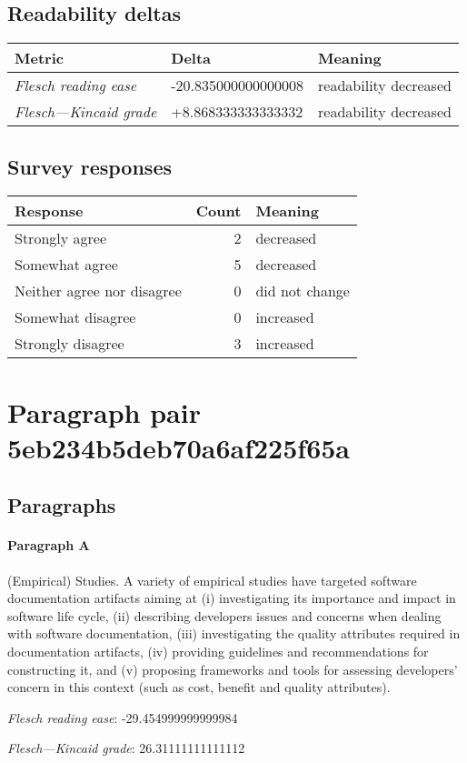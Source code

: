 \subsection{Readability deltas}

\begin{tabular}{lll}
\toprule
               \textbf{Metric} &       \textbf{Delta} &       \textbf{Meaning} \\
\midrule
    \emph{Flesch reading ease} &  -20.835000000000008 &  readability decreased \\
 \emph{Flesch---Kincaid grade} &   +8.868333333333332 &  readability decreased \\
\bottomrule
\end{tabular}

\subsection{Survey responses}
\begin{tabular}{lrl}
\toprule
          \textbf{Response} &  \textbf{Count} & \textbf{Meaning} \\
\midrule
             Strongly agree &               2 &        decreased \\
             Somewhat agree &               5 &        decreased \\
 Neither agree nor disagree &               0 &   did not change \\
          Somewhat disagree &               0 &        increased \\
          Strongly disagree &               3 &        increased \\
\bottomrule
\end{tabular}

\section{Paragraph pair 5eb234b5deb70a6af225f65a}
\subsection{Paragraphs}
\paragraph{Paragraph A}
(Empirical) Studies. A variety of empirical studies have targeted software documentation artifacts aiming at (i) investigating its importance and impact in software life cycle, (ii) describing developers issues and concerns when dealing with software documentation, (iii) investigating the quality attributes required in documentation artifacts, (iv) providing guidelines and recommendations for constructing it, and (v) proposing frameworks and tools for assessing developers' concern in this context (such as cost, benefit and quality attributes).\par\medskip\emph{Flesch reading ease}: -29.454999999999984\par\emph{Flesch---Kincaid grade}: 26.31111111111112

